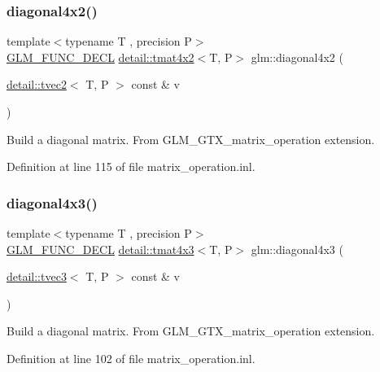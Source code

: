 \subsubsection{\texorpdfstring{diagonal4x2()}{diagonal4x2()}}
{\footnotesize\ttfamily template$<$typename T , precision P$>$ \\
\hyperlink{setup_8hpp_ab2d052de21a70539923e9bcbf6e83a51}{G\+L\+M\+\_\+\+F\+U\+N\+C\+\_\+\+D\+E\+CL} \hyperlink{structglm_1_1detail_1_1tmat4x2}{detail\+::tmat4x2}$<$T, P$>$ glm\+::diagonal4x2 (\begin{DoxyParamCaption}\item[{\hyperlink{structglm_1_1detail_1_1tvec2}{detail\+::tvec2}$<$ T, P $>$ const \&}]{v }\end{DoxyParamCaption})}

Build a diagonal matrix. From G\+L\+M\+\_\+\+G\+T\+X\+\_\+matrix\+\_\+operation extension. 

Definition at line 115 of file matrix\+\_\+operation.\+inl.

\mbox{\label{group__gtx__matrix__operation_gaff804ead2f02ac48c8daf0d44a81d224}} 
\subsubsection{\texorpdfstring{diagonal4x3()}{diagonal4x3()}}
{\footnotesize\ttfamily template$<$typename T , precision P$>$ \\
\hyperlink{setup_8hpp_ab2d052de21a70539923e9bcbf6e83a51}{G\+L\+M\+\_\+\+F\+U\+N\+C\+\_\+\+D\+E\+CL} \hyperlink{structglm_1_1detail_1_1tmat4x3}{detail\+::tmat4x3}$<$T, P$>$ glm\+::diagonal4x3 (\begin{DoxyParamCaption}\item[{\hyperlink{structglm_1_1detail_1_1tvec3}{detail\+::tvec3}$<$ T, P $>$ const \&}]{v }\end{DoxyParamCaption})}

Build a diagonal matrix. From G\+L\+M\+\_\+\+G\+T\+X\+\_\+matrix\+\_\+operation extension. 

Definition at line 102 of file matrix\+\_\+operation.\+inl.

\mbox{\label{group__gtx__matrix__operation_ga0c286e9aa92074f12663617cfedfa72c}} 
